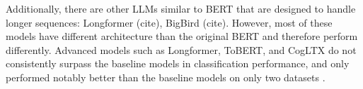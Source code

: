 Additionally, there are other LLMs similar to BERT that are designed to handle longer sequences: Longformer (cite), BigBird (cite). However, most of these models have different architecture than the original BERT and therefore perform differently.
Advanced models such as Longformer, ToBERT, and CogLTX do not consistently surpass the baseline models in classification performance, and only performed notably better than the baseline models on only two datasets \cite{park-2022-efficient}.


